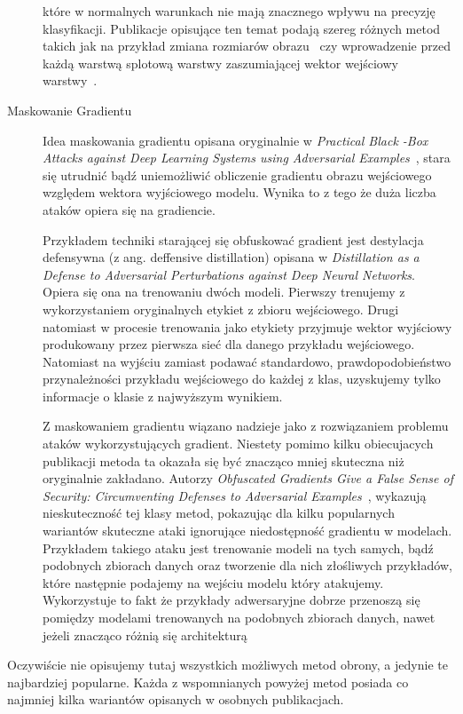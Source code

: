 \documentclass[
    left=2.5cm,         %
    right=2.5cm,        %
    top=2.5cm,          %
    bottom=3cm,         %
    bindingoffset=6mm,  %
    nohyphenation=false %
]{eiti/eiti-thesis}
\begin{document}
\begin{description}
        które w normalnych warunkach nie mają znacznego wpływu na precyzję klasyfikacji.
        Publikacje opisujące ten temat podają szereg różnych metod takich jak na przykład zmiana rozmiarów obrazu~\cite{DBLP:journals/corr/abs-1711-01991} czy
        wprowadzenie przed każdą warstwą splotową warstwy zaszumiającej wektor wejściowy warstwy~\cite{DBLP:journals/corr/abs-1712-00673}.
    \item[Maskowanie Gradientu]
        Idea maskowania gradientu opisana oryginalnie w \textit{Practical Black -Box Attacks against Deep Learning Systems using Adversarial Examples}~\cite{DBLP:journals/corr/PapernotMGJCS16},
        stara się utrudnić bądź uniemożliwić obliczenie gradientu obrazu wejściowego względem wektora wyjściowego modelu.
        Wynika to z tego że duża liczba ataków opiera się na gradiencie.

        Przykładem techniki starającej się obfuskować gradient jest destylacja defensywna (z ang. deffensive distillation) opisana w
        \textit{Distillation as a Defense to Adversarial Perturbations against Deep Neural Networks}\cite{DBLP:journals/corr/PapernotMWJS15}.
        Opiera się ona na trenowaniu dwóch modeli.
        Pierwszy trenujemy z wykorzystaniem oryginalnych etykiet z zbioru wejściowego.
        Drugi natomiast w procesie trenowania jako etykiety przyjmuje wektor wyjściowy produkowany przez pierwsza sieć dla danego przykładu wejściowego.
        Natomiast na wyjściu zamiast podawać standardowo, prawdopodobieństwo przynależności przykładu wejściowego do każdej z klas, uzyskujemy tylko informacje o
        klasie z najwyższym wynikiem.

        Z maskowaniem gradientu wiązano nadzieje jako z rozwiązaniem problemu ataków wykorzystujących gradient. Niestety pomimo kilku obiecujacych publikacji
        metoda ta okazała się być znacząco mniej skuteczna niż oryginalnie zakładano.
        Autorzy \textit{Obfuscated Gradients Give a False Sense of Security: Circumventing Defenses to Adversarial Examples}~\cite{DBLP:journals/corr/abs-1802-00420},
        wykazują nieskuteczność tej klasy metod, pokazując dla kilku popularnych wariantów skuteczne ataki ignorujące niedostępność gradientu w modelach.
        Przykładem takiego ataku jest trenowanie modeli na tych samych, bądź podobnych zbiorach danych oraz tworzenie dla nich złośliwych przykładów, które
        następnie podajemy na wejściu modelu który atakujemy. Wykorzystuje to fakt że przykłady adwersaryjne dobrze przenoszą się pomiędzy modelami trenowanych na
        podobnych zbiorach danych, nawet jeżeli znacząco różnią się architekturą


\end{description}
Oczywiście nie opisujemy tutaj wszystkich możliwych metod obrony, a jedynie te najbardziej popularne. Każda z wspomnianych powyżej metod posiada co najmniej kilka
wariantów opisanych w osobnych publikacjach.
\newpage
\end{document}
